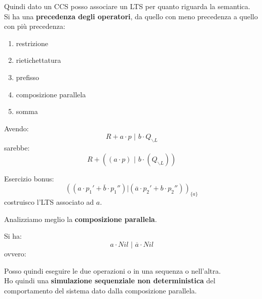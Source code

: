 \documentclass[a4paper,12pt, oneside]{book}
\begin{document}
Quindi dato un CCS posso associare un LTS per quanto riguarda la semantica.\\
Si ha una \textbf{precedenza degli operatori}, da quello con meno precedenza a
quello con più precedenza: 
\begin{enumerate}
  \item restrizione
  \item rietichettatura
  \item prefisso
  \item composizione parallela
  \item somma
\end{enumerate}
\begin{esempio}
  Avendo:
  \[R+a\cdot p\,\,|\,\,b\cdot Q_{\backslash L}\]
  sarebbe:
  \[R+((a\cdot p)\,\,|\,\,b\cdot(Q_{\backslash L}))\]
\end{esempio}
\begin{esempio}
  Esercizio bonus:
  \[((a\cdot p_1'+\overline{b}\cdot p_1'')|(\overline{a}\cdot p_2'+b\cdot
    p_2''))_{\{a\}}\]
  costruisco l'LTS associato ad $a$.
\end{esempio}
Analizziamo meglio la \textbf{composizione parallela}.\\
\begin{esempio}
  Si ha:
  \[a\cdot Nil\,\,|\,\,\overline{a}\cdot Nil\]
  ovvero:
  \begin{center}
  \end{center}
  Posso quindi eseguire le due operazioni o in una sequenza o nell'altra.\\
  Ho quindi una \textbf{simulazione sequenziale non deterministica} del
  comportamento del sistema dato dalla composizione parallela.
\end{esempio}
\end{document}
